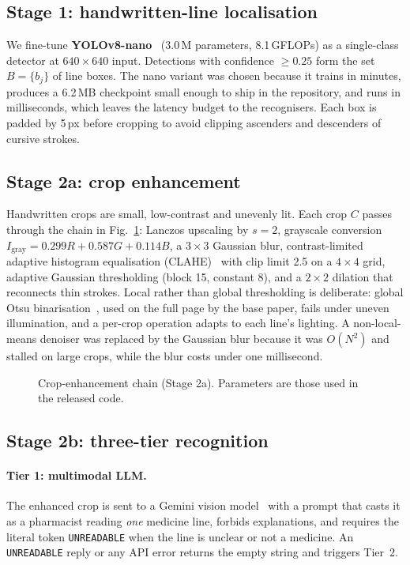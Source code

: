 \documentclass[journal]{IEEEtran}
\begin{document}
\subsection{Stage 1: handwritten-line localisation}
We fine-tune \textbf{YOLOv8-nano}~\cite{jocher2023yolov8} (3.0\,M parameters, 8.1\,GFLOPs) as a single-class detector at $640{\times}640$ input. Detections with confidence $\ge 0.25$ form the set $B=\{b_j\}$ of line boxes. The nano variant was chosen because it trains in minutes, produces a 6.2\,MB checkpoint small enough to ship in the repository, and runs in milliseconds, which leaves the latency budget to the recognisers. Each box is padded by 5\,px before cropping to avoid clipping ascenders and descenders of cursive strokes.

\subsection{Stage 2a: crop enhancement}\label{sec:enhance}
Handwritten crops are small, low-contrast and unevenly lit. Each crop $C$ passes through the chain in Fig.~\ref{fig:enhance}: Lanczos upscaling by $s{=}2$, grayscale conversion $I_{\text{gray}}=0.299R+0.587G+0.114B$, a $3{\times}3$ Gaussian blur, contrast-limited adaptive histogram equalisation (CLAHE)~\cite{zuiderveld1994clahe} with clip limit 2.5 on a $4{\times}4$ grid, adaptive Gaussian thresholding (block 15, constant 8), and a $2{\times}2$ dilation that reconnects thin strokes. Local rather than global thresholding is deliberate: global Otsu binarisation~\cite{otsu1979threshold}, used on the full page by the base paper, fails under uneven illumination, and a per-crop operation adapts to each line's lighting. A non-local-means denoiser was replaced by the Gaussian blur because it was $O(N^2)$ and stalled on large crops, while the blur costs under one millisecond.

\begin{figure}[t]
\centering
\resizebox{0.95\textwidth}{!}{}
\caption{Crop-enhancement chain (Stage 2a). Parameters are those used in the released code.}
\label{fig:enhance}
\end{figure}

\subsection{Stage 2b: three-tier recognition}\label{sec:recog}
\paragraph{Tier 1: multimodal LLM.} The enhanced crop is sent to a Gemini vision model~\cite{gemini2023} with a prompt that casts it as a pharmacist reading \emph{one} medicine line, forbids explanations, and requires the literal token \texttt{UNREADABLE} when the line is unclear or not a medicine. An \texttt{UNREADABLE} reply or any API error returns the empty string and triggers Tier~2.
\end{document}
